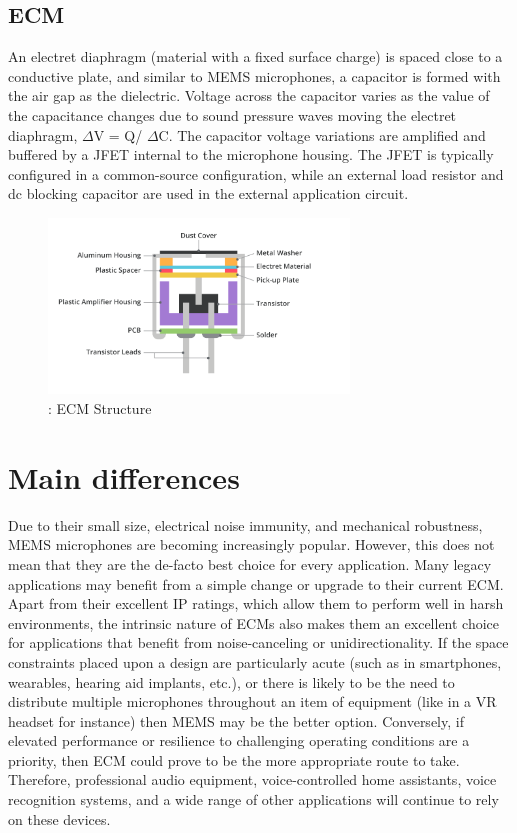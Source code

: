 \subsection{ECM}
An electret diaphragm (material with a fixed surface charge) is spaced close to a conductive plate, and similar to MEMS microphones, a capacitor is formed with the air gap as the dielectric. Voltage across the capacitor varies as the value of the capacitance changes due to sound pressure waves moving the electret diaphragm, $\Delta$V = Q/ $\Delta$C. The capacitor voltage variations are amplified and buffered by a JFET internal to the microphone housing. The JFET is typically configured in a common-source configuration, while an external load resistor and dc blocking capacitor are used in the external application circuit. \cite{mems}
\break
\begin{figure}[H]
    \centering
    \includegraphics[width=8cm]{LiveAudioWatermarking/images/ECM.png}
    \caption{: ECM Structure}
    \label{fig:ECM}
\end{figure}
\section{Main differences}
Due to their small size, electrical noise immunity, and mechanical robustness, MEMS microphones are becoming increasingly popular. However, this does not mean that they are the de-facto best choice for every application. Many legacy applications may benefit from a simple change or upgrade to their current ECM. Apart from their excellent IP ratings, which allow them to perform well in harsh environments, the intrinsic nature of ECMs also makes them an excellent choice for applications that benefit from noise-canceling or unidirectionality.
\newpage
If the space constraints placed upon a design are particularly acute (such as in smartphones, wearables, hearing aid implants, etc.), or there is likely to be the need to distribute multiple microphones throughout an item of equipment (like in a VR headset for instance) then MEMS may be the better option.
Conversely, if elevated performance or resilience to challenging operating conditions are a priority, then ECM could prove to be the more appropriate route to take. Therefore, professional audio equipment, voice-controlled home assistants, voice recognition systems, and a wide range of other applications will continue to rely on these devices. \cite{compare}





